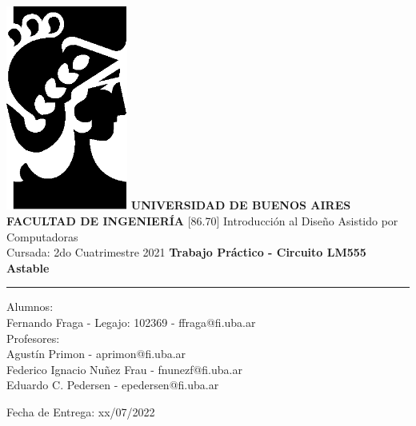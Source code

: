\begin{titlepage} %
    \begin{center}
	\includegraphics[width=4cm]{./aux/logo_fiuba.png}
    \vskip1cm
    \huge \textbf{UNIVERSIDAD DE BUENOS AIRES \\ FACULTAD DE INGENIERÍA}
    \vskip0.5cm
    \Large [86.70] Introducción al Diseño Asistido por Computadoras \\ Cursada: 2do Cuatrimestre 2021
    \vskip0.5cm
    \huge \textbf{Trabajo Práctico - Circuito LM555 Astable}
    
    \rule{15cm}{0.1mm}
    \end{center}
    
    \hspace{1.5cm}\large Alumnos:\\
    
    \hspace{2.5cm} Fernando Fraga - Legajo: 102369 - ffraga@fi.uba.ar \\
    
    \hspace{1.5cm}\large Profesores:\\
    
    \hspace{2.5cm} Agustín Primon - aprimon@fi.uba.ar\\
    
    \hspace{2.5cm} Federico Ignacio Nuñez Frau - fnunezf@fi.uba.ar\\
    
    \hspace{2.5cm} Eduardo C. Pedersen - epedersen@fi.uba.ar\\
    
    \vskip1cm
    
    \hspace{1.5cm}\large Fecha de Entrega: \color{red} xx/07/2022\\
    

\end{titlepage}
